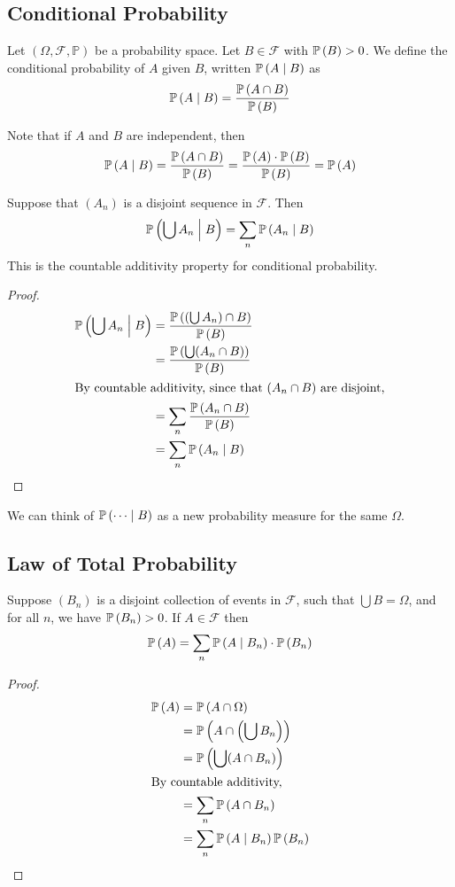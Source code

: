 \subsection{Conditional Probability}
\begin{definition}
	Let \((\Omega, \mathcal F, \mathbb P)\) be a probability space. Let \(B \in \mathcal F\) with \(\mathbb{P}\left({B}\right) > 0\). We define the conditional probability of \(A\) given \(B\), written \(\mathbb{P}\left({A \mid B}\right)\) as
	\[ \mathbb{P}\left({A \mid B}\right) = \frac{\mathbb{P}\left({A \cap B}\right)}{\mathbb{P}\left({B}\right)} \]
\end{definition}
\noindent Note that if \(A\) and \(B\) are independent, then
\[ \mathbb{P}\left({A \mid B}\right) = \frac{\mathbb{P}\left({A \cap B}\right)}{\mathbb{P}\left({B}\right)} = \frac{\mathbb{P}\left({A}\right) \cdot \mathbb{P}\left({B}\right)}{\mathbb{P}\left({B}\right)} = \mathbb{P}\left({A}\right) \]
\begin{claim}
	Suppose that \((A_n)\) is a disjoint sequence in \(\mathcal F\). Then
	\[ \mathbb{P}\left({\bigcup A_n \mathrel{\Big|} B}\right) = \sum_{n} \mathbb{P}\left({A_n \mid B}\right) \]
	This is the countable additivity property for conditional probability.
\end{claim}
\begin{proof}
	\begin{align*}
		\mathbb{P}\left({\bigcup A_n \mathrel{\Big|} B}\right) & = \frac{\mathbb{P}\left({(\bigcup A_n) \cap B}\right)}{\mathbb{P}\left({B}\right)} \\
		                                     & = \frac{\mathbb{P}\left({\bigcup (A_n \cap B)}\right)}{\mathbb{P}\left({B}\right)} \\
		\intertext{By countable additivity, since that \((A_n \cap B)\) are disjoint,}
		                                     & = \sum_n \frac{\mathbb{P}\left({A_n \cap B}\right)}{\mathbb{P}\left({B}\right)}    \\
		                                     & = \sum_n \mathbb{P}\left({A_n \mid B}\right)
	\end{align*}
\end{proof}
\noindent We can think of \(\mathbb{P}\left({\dots \mid B}\right)\) as a new probability measure for the same \(\Omega\).

\subsection{Law of Total Probability}
\begin{claim}
	Suppose \((B_n)\) is a disjoint collection of events in \(\mathcal F\), such that \(\bigcup B = \Omega\), and for all \(n\), we have \(\mathbb{P}\left({B_n}\right) > 0\). If \(A \in \mathcal F\) then
	\[ \mathbb{P}\left({A}\right) = \sum_n \mathbb{P}\left({A \mid B_n}\right) \cdot \mathbb{P}\left({B_n}\right) \]
\end{claim}
\begin{proof}
	\begin{align*}
		\mathbb{P}\left({A}\right) & = \mathbb{P}\left({A \cap \Omega}\right)                   \\
		         & = \mathbb{P}\left({A \cap \left(\bigcup B_n\right)}\right) \\
		         & = \mathbb{P}\left({\bigcup(A \cap B_n)}\right)             \\
		\intertext{By countable additivity,}
		         & = \sum_n \mathbb{P}\left({A \cap B_n}\right)               \\
		         & = \sum_n \mathbb{P}\left({A \mid B_n}\right) \mathbb{P}\left({B_n}\right)
	\end{align*}
\end{proof}


